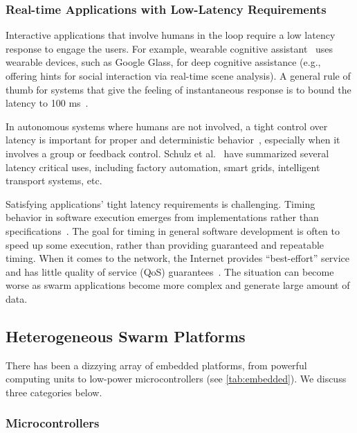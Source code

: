 \subsubsection{Real-time Applications with Low-Latency Requirements}
\label{sec:inter-low-latency}

Interactive applications that involve humans in the loop require a low latency
response to engage the users. For example, wearable cognitive
assistant~\cite{chen2018application} uses wearable devices, such as Google
Glass, for deep cognitive assistance (e.g., offering hints for social
interaction via real-time scene analysis). A general rule of thumb for systems
that give the feeling of instantaneous response is to bound the latency to 100
ms~\cite{miller1968response, nielsen1994usability}.

In autonomous systems where humans are not involved, a tight control over
latency is important for proper and deterministic
behavior~\cite{eidson2012distributed}, especially when it involves a group or
feedback control. Schulz et al.~\cite{schulz2017latency} have summarized several
latency critical uses, including factory automation, smart grids, intelligent
transport systems, etc.

Satisfying applications' tight latency requirements is challenging. Timing
behavior in software execution emerges from implementations rather than
specifications~\cite{lee2018real}. The goal for timing in general software
development is often to speed up some execution, rather than providing
guaranteed and repeatable timing. When it comes to the network, the Internet
provides ``best-effort'' service and has little quality of service (QoS)
guarantees~\cite{shenker1995fundamental}. The situation can become worse as
swarm applications become more complex and generate large amount of data.

\subsection{Heterogeneous Swarm Platforms}
\label{sec:swarm-platforms}

There has been a dizzying array of embedded platforms, from powerful computing
units to low-power microcontrollers (see \autoref{tab:embedded}). We discuss
three categories below.

\subsubsection{Microcontrollers}

